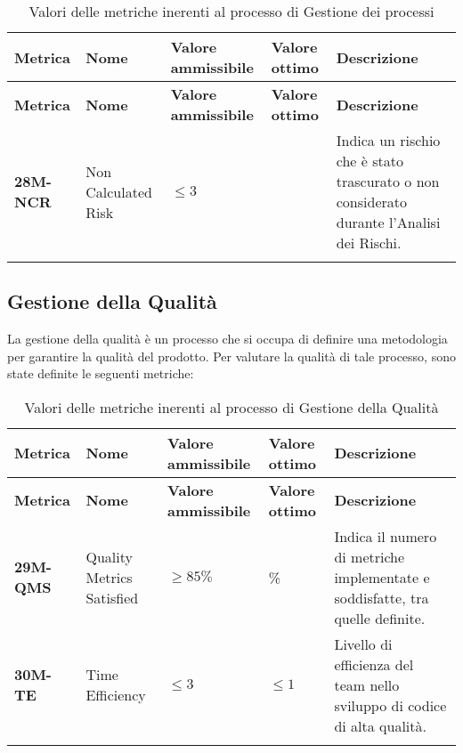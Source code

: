 \begin{longtable}{|>{\raggedright\arraybackslash}m{}|>{\raggedright\arraybackslash}m{}|>{\raggedright\arraybackslash}m{}|>{\raggedright\arraybackslash}m{}|>{\raggedright\arraybackslash}m{}|}
	\hline
	\textbf{Metrica} & \textbf{Nome}       & \textbf{Valore ammissibile} & \textbf{Valore ottimo} & \textbf{Descrizione}                                                                     \\
	\hline
	\endfirsthead
	\hline
	\textbf{Metrica} & \textbf{Nome}       & \textbf{Valore ammissibile} & \textbf{Valore ottimo} & \textbf{Descrizione}                                                                     \\
	\endhead
	\textbf{28M-NCR} & Non Calculated Risk & $\leq 3 $                   & 0                      & Indica un rischio che è stato trascurato o non considerato durante l’Analisi dei Rischi. \\
	\hline
	\hline
	\caption{ Valori delle metriche inerenti al processo di Gestione dei processi}
	\label{table:9}
\end{longtable}

\subsection{Gestione della Qualità}
La gestione della qualità è un processo che si occupa di definire una metodologia per garantire la qualità del prodotto.
Per valutare la qualità di tale processo, sono state definite le seguenti metriche:

\begin{longtable}{|>{\raggedright\arraybackslash}m{}|>{\raggedright\arraybackslash}m{}|>{\raggedright\arraybackslash}m{}|>{\raggedright\arraybackslash}m{}|>{\raggedright\arraybackslash}m{}|}
	\hline
	\textbf{Metrica} & \textbf{Nome}             & \textbf{Valore ammissibile} & \textbf{Valore ottimo} & \textbf{Descrizione}                                                          \\
	\hline
	\endfirsthead
	\hline
	\textbf{Metrica} & \textbf{Nome}             & \textbf{Valore ammissibile} & \textbf{Valore ottimo} & \textbf{Descrizione}                                                          \\
	\endhead
	\textbf{29M-QMS} & Quality Metrics Satisfied & $\geq 85\% $                & 100\%                  & Indica il numero di metriche implementate e soddisfatte, tra quelle definite. \\
	\hline
	\textbf{30M-TE}  & Time Efficiency           & $\leq 3 $                   & $\leq 1 $              & Livello di efficienza del team nello sviluppo di codice di alta qualità.      \\
	\hline
	\caption{ Valori delle metriche inerenti al processo di Gestione della Qualità}
	\label{table:10}
\end{longtable}


